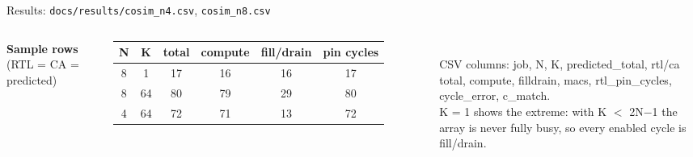 \documentclass[aspectratio=169,11pt]{beamer}
\newcommand{\file}[1]{\texttt{\textcolor{copper}{#1}}}
\begin{document}
\begin{frame}{Results: \file{docs/results/cosim\_n4.csv}, \file{cosim\_n8.csv}}
  \begin{columns}[T]
    \centering
    \scriptsize
    \textbf{Sample rows} (RTL = CA = predicted)\\[1mm]
    \begin{tabular}{@{}c c c c c c@{}}
      \toprule
      \textbf{N} & \textbf{K} & \textbf{total} & \textbf{compute} & \textbf{fill/drain} & \textbf{pin cycles} \\
      \midrule
      8 & 1  & 17 & 16 & 16 & 17 \\
      8 & 64 & 80 & 79 & 29 & 80 \\
      4 & 64 & 72 & 71 & 13 & 72 \\
      \bottomrule
    \end{tabular}\\[2mm]
    \small
    CSV columns: job, N, K, predicted\_total, rtl/ca total, compute, filldrain, macs,
    rtl\_pin\_cycles, cycle\_error, c\_match.\\[1mm]
    \footnotesize\color{muted} K = 1 shows the extreme: with K $<$ 2N$-$1 the array is never fully
    busy, so every enabled cycle is fill/drain.
  \end{columns}
\end{frame}
\end{document}
